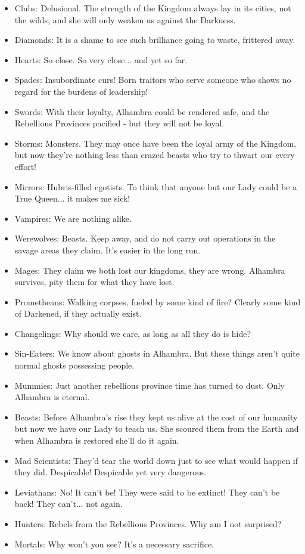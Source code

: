 \begin{itemize}
\item Clubs: Delusional. The strength of the Kingdom always lay in its cities, not the wilds, and she will only weaken us against the Darkness.
\item Diamonds: It is a shame to see such brilliance going to waste, frittered away.
\item Hearts: So close. So very close... and yet so far.
\item Spades: Insubordinate curs! Born traitors who serve someone who shows no regard for the burdens of leadership!
\item Swords: With their loyalty, Alhambra could be rendered safe, and the Rebellious Provinces pacified - but they will not be loyal.
\item Storms: Monsters. They may once have been the loyal army of the Kingdom, but now they're nothing less than crazed beasts who try to thwart our every effort!
\item Mirrors: Hubris-filled egotists. To think that anyone but our Lady could be a True Queen... it makes me sick!

\item Vampires: We are nothing alike.
\item Werewolves: Beasts. Keep away, and do not carry out operations in the savage areas they claim. It's easier in the long run.
\item Mages: They claim we both lost our kingdoms, they are wrong. Alhambra survives, pity them for what they have lost. 
\item Prometheans: Walking corpses, fueled by some kind of fire? Clearly some kind of Darkened, if they actually exist.
\item Changelings: Why should we care, as long as all they do is hide?
\item Sin-Eaters: We know about ghosts in Alhambra. But these things aren't quite normal ghosts possessing people.
\item Mummies: Just another rebellious province time has turned to dust. Only Alhambra is eternal.
\item Beasts: Before Alhambra's rise they kept us alive at the cost of our humanity but now we have our Lady to teach us. She scoured them from the Earth and when Alhambra is restored she'll do it again. 
\item Mad Scientists: They'd tear the world down just to see what would happen if they did. Despicable! Despicable yet very dangerous.
\item Leviathans: No! It can't be! They were said to be extinct! They can't be back! They can't... not again.
\item Hunters: Rebels from the Rebellious Provinces. Why am I not surprised?
\item Mortals: Why won't you see? It's a necessary sacrifice. 
\end{itemize}

